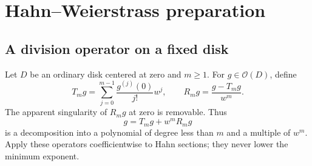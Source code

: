 \documentclass[11pt,oneside]{article}
\numberwithin{equation}{section}
\theoremstyle{definition}
\theoremstyle{remark}\newtheorem{remark}[theorem]{Remark}
\newcommand{\OO}{\mathcal O}
\begin{document}
\section{Hahn--Weierstrass preparation}\label{sec:preparation}
\subsection{A division operator on a fixed disk}
Let $D$ be an ordinary disk centered at zero and $m\geq1$. For
$g\in\OO(D)$, define
\[
 T_mg=\sum_{j=0}^{m-1}\frac{g^{(j)}(0)}{j!}w^j,
 \qquad R_mg=\frac{g-T_mg}{w^m}.
\]
The apparent singularity of $R_mg$ at zero is removable. Thus
\[
 g=T_mg+w^mR_mg
\]
is a decomposition into a polynomial of degree less than $m$ and a
multiple of $w^m$. Apply these operators coefficientwise to Hahn sections;
they never lower the minimum exponent.
\end{document}
